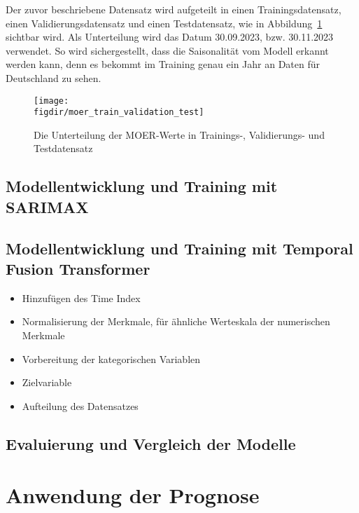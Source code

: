 Der zuvor beschriebene Datensatz wird aufgeteilt in einen Trainingsdatensatz, einen Validierungsdatensatz und einen Testdatensatz, wie in Abbildung~\ref{FIG:moer_train_validation_test} sichtbar wird.
Als Unterteilung wird das Datum 30.09.2023, bzw. 30.11.2023 verwendet.
So wird sichergestellt, dass die Saisonalität vom Modell erkannt werden kann, denn es bekommt im Training genau ein Jahr an Daten für Deutschland zu sehen.
\begin{figure}
 \caption{Die Unterteilung der MOER-Werte in Trainings-, Validierungs- und Testdatensatz}
 {\texttt{[image: \\figdir/moer\_train\_validation\_test]}}
 \label{FIG:moer_train_validation_test}
\end{figure}

\section{Modellentwicklung und Training mit SARIMAX}
\section{Modellentwicklung und Training mit Temporal Fusion Transformer}
\begin{itemize}
 \item Hinzufügen des Time Index
 \item Normalisierung der Merkmale, für ähnliche Werteskala der numerischen Merkmale
 \item Vorbereitung der kategorischen Variablen
 \item Zielvariable
 \item Aufteilung des Datensatzes
\end{itemize}
\section{Evaluierung und Vergleich der Modelle}

\chapter{Anwendung der Prognose}
